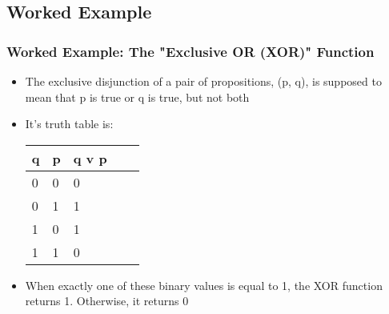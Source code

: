 \documentclass[
  shownotes,
  xcolor={svgnames},
  hyperref={colorlinks,citecolor=DarkBlue,linkcolor=DarkRed,urlcolor=DarkBlue}
  , aspectratio=169]{beamer}
\begin{document}
\subsection{Worked Example}
\begin{frame}
\frametitle{Worked Example: The "Exclusive OR (XOR)" Function}
\begin{itemize}
\item The exclusive disjunction of a pair of propositions, (p, q), is supposed to mean that p is true or q is true, but not both
\item It's truth table is:

\begin{table}[H]
\begin{tabular}{lllll}
q  & p & q v p \\
\hline
0 & 0 & 0 \\
0 & 1 & 1 \\
1 & 0 & 1 \\
1 & 1 & 0 \\
\end{tabular}
\end{table}
\item When exactly one of these binary values is equal to 1, the XOR function
returns 1. Otherwise, it returns 0
\end{itemize}

\end{frame}
\end{document}

